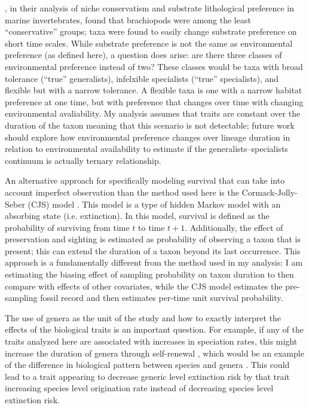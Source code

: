 \documentclass{article}
\begin{document}
\citet{Hopkins2014a}, in their analysis of niche conservatism and substrate lithological preference in marine invertebrates, found that brachiopods were among the least ``conservative'' groups; taxa were found to easily change substrate preference on short time scales. While substrate preference is not the same as environmental preference (as defined here), a question does arise: are there three classes of environmental preference instead of two? These classes would be taxa with broad tolerance (``true'' generalists), infelxible specialists (``true'' specialists), and flexible but with a narrow tolerance. A flexible taxa is one with a narrow habitat preference at one time, but with preference that changes over time with changing environmental avaliability. My analysis assumes that traits are constant over the duration of the taxon meaning that this scenario is not detectable; future work should explore how environmental preference changes over lineage duration in relation to environmental availability to estimate if the generalists--specialists continuum is actually ternary relationship.

An alternative approach for specifically modeling survival that can take into account imperfect observation than the method used here is the Cormack-Jolly-Seber (CJS) model \citep{Royle2008,Liow2008,Tomiya2013,Liow2010b}. This model is a type of hidden Markov model with an absorbing state (i.e. extinction). In this model, survival is defined as the probability of surviving from time \(t\) to time \(t + 1\). Additionally, the effect of preservation and sighting is estimated as probability of observing a taxon that is present; this can extend the duration of a taxon beyond its last occurrence. This approach is a fundamentally different from the method used in my analysis: I am estimating the biasing effect of sampling probability on taxon duration to then compare with effects of other covariates, while the CJS model estimates the pre-sampling fossil record and then estimates per-time unit survival probability.

The use of genera as the unit of the study and how to exactly interpret the effects of the biological traits is an important question. For example, if any of the traits analyzed here are associated with increases in speciation rates, this might increase the duration of genera through self-renewal \citep{Raup1991b,Raup1994}, which would be an example of the difference in biological pattern between species and genera \citep{Jablonski1987,Jablonski2007,Jablonski2008a}. This could lead to a trait appearing to decrease generic level extinction risk by that trait increasing species level origination rate instead of decreasing species level extinction risk. %
\end{document}
